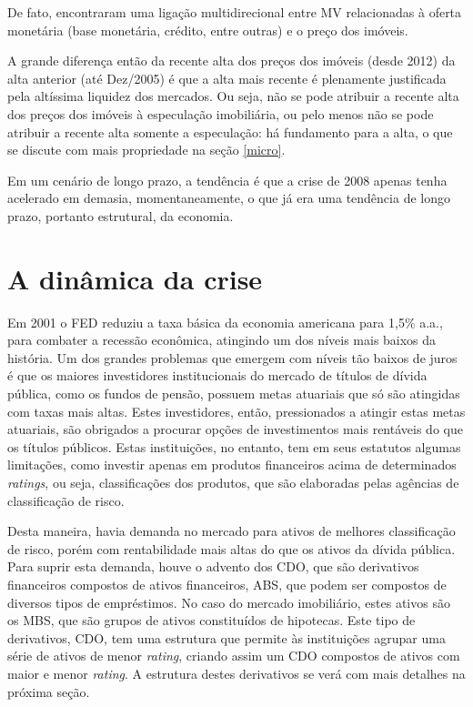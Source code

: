 \documentclass[
	12pt,				%
	oneside,			%
	a4paper,			%
	chapter=TITLE,		%
	section=TITLE,		%
	english,			%
	brazil				%
	]{abntex2}
\begin{document}
De fato, \textcite{goodhart2008} encontraram uma ligação multidirecional entre \gls{MV}
relacionadas à oferta monetária (base monetária, crédito, entre outras) e o
preço dos imóveis.

A grande diferença então da recente alta dos preços dos imóveis (desde 2012) da
alta anterior (até Dez/2005) é que a alta mais recente é plenamente justificada
pela altíssima liquidez dos mercados. Ou seja, não se pode atribuir a recente
alta dos preços dos imóveis à especulação imobiliária, ou pelo menos não se pode
atribuir a recente alta somente a especulação: há fundamento para a alta, o que
se discute com mais propriedade na seção \ref{micro}.

Em um cenário de longo prazo, a tendência é que a crise de 2008 apenas tenha
acelerado em demasia, momentaneamente, o que já era uma tendência de longo
prazo, portanto estrutural, da economia.

\hypertarget{a-dinuxe2mica-da-crise}{%
\section{A dinâmica da crise}\label{a-dinuxe2mica-da-crise}}

Em 2001 o \gls{FED} reduziu a taxa básica da economia americana para 1,5\% a.a.,
para combater a recessão econômica, atingindo um dos níveis mais baixos da
história. Um dos grandes problemas que emergem com níveis tão baixos de juros é
que os maiores investidores institucionais do mercado de títulos de dívida
pública, como os fundos de pensão, possuem metas atuariais que só são atingidas
com taxas mais altas. Estes investidores, então, pressionados a atingir estas
metas atuariais, são obrigados a procurar opções de investimentos mais rentáveis
do que os títulos públicos. Estas instituições, no entanto, tem em seus
estatutos algumas limitações, como investir apenas em produtos financeiros acima
de determinados \emph{ratings}, ou seja, classificações dos produtos, que são
elaboradas pelas agências de classificação de risco.

Desta maneira, havia demanda no mercado para ativos de melhores classificação de
risco, porém com rentabilidade mais altas do que os ativos da dívida pública.
Para suprir esta demanda, houve o advento dos \gls{CDO}, que são derivativos
financeiros compostos de ativos financeiros, \gls{ABS}, que podem ser compostos
de diversos tipos de empréstimos. No caso do mercado imobiliário, estes ativos
são os \gls{MBS}, que são grupos de ativos constituídos de hipotecas. Este tipo
de derivativos, \gls{CDO}, tem uma estrutura que permite às instituições agrupar
uma série de ativos de menor \emph{rating}, criando assim um \gls{CDO} compostos de
ativos com maior e menor \emph{rating}. A estrutura destes derivativos se verá com
mais detalhes na próxima seção.
\end{document}
